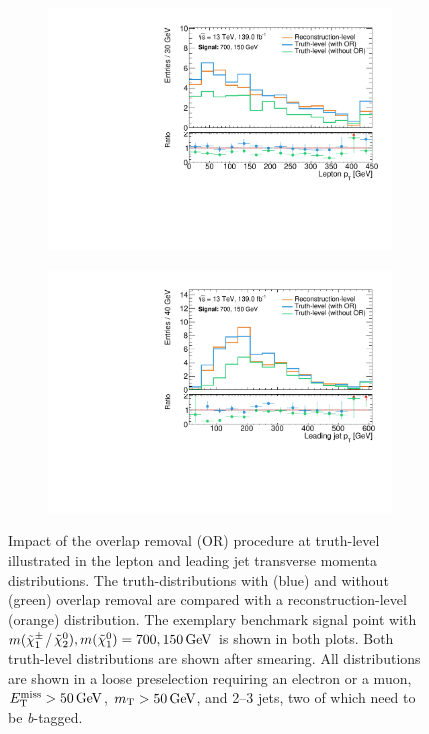  \begin{figure}
	\centering
	\begin{subfigure}[b]{0.49\linewidth}
		\centering\includegraphics[width=\textwidth]{20210324_noLabel_noOR/700_150/lep1Pt_C1N2_Wh_hbb_700p0_150p0_smeared.pdf}
	\end{subfigure}\hfill
	\begin{subfigure}[b]{0.49\linewidth}
		\centering\includegraphics[width=\textwidth]{20210324_noLabel_noOR/700_150/jet1Pt_C1N2_Wh_hbb_700p0_150p0_smeared.pdf}
	\end{subfigure}\hfill
	\caption{Impact of the overlap removal (OR) procedure at truth-level illustrated in the lepton and leading jet transverse momenta distributions. The truth-distributions with (blue) and without (green) overlap removal are compared with a reconstruction-level (orange) distribution. The exemplary benchmark signal point with \mbox{$m(\tilde{\chi}_1^\pm$/$\neutr), m(\lsp) = 700, \SI{150}{\GeV}$} is shown in both plots. Both truth-level distributions are shown after smearing. All distributions are shown in a loose preselection requiring an electron or a muon, $\met>\SI{50}{\GeV}$, $\mt > \SI{50}{\GeV}$, and 2--3 jets, two of which need to be \textit{b}-tagged.}
	\label{fig:overlap_removal_truth}
\end{figure}

